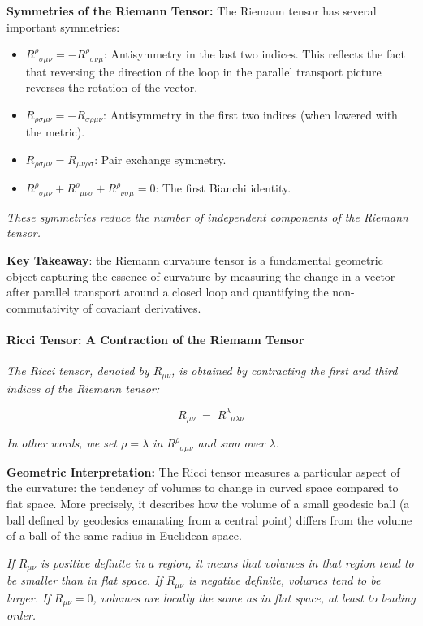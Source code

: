 \textbf{Symmetries of the Riemann Tensor:} The Riemann tensor has several important symmetries:
\begin{itemize}
    \item \(R^\rho_{\;\;\sigma\mu\nu} = -R^\rho_{\;\;\sigma\nu\mu}\): Antisymmetry in the last two indices. This reflects the fact that reversing the direction of the loop in the parallel transport picture reverses the rotation of the vector.
    \item \(R_{\rho\sigma\mu\nu} = -R_{\sigma\rho\mu\nu}\): Antisymmetry in the first two indices (when lowered with the metric).
    \item \(R_{\rho\sigma\mu\nu} = R_{\mu\nu\rho\sigma}\): Pair exchange symmetry.
    \item \(R^\rho_{\;\;\sigma\mu\nu} + R^\rho_{\;\;\mu\nu\sigma} + R^\rho_{\;\;\nu\sigma\mu} = 0\): The first Bianchi identity.
\end{itemize}

\textit{These symmetries reduce the number of independent components of the Riemann tensor.}

\textbf{Key Takeaway}: the Riemann curvature tensor is a fundamental geometric object capturing the essence of curvature by measuring the change in a vector after parallel transport around a closed loop and quantifying the non-commutativity of covariant derivatives.

\paragraph{Ricci Tensor: A Contraction of the Riemann Tensor}

\textit{The Ricci tensor, denoted by \(R_{\mu\nu}\), is obtained by contracting the first and third indices of the Riemann tensor:}

\[
R_{\mu\nu} \;=\; R^\lambda_{\;\;\mu\lambda\nu}
\]

\textit{In other words, we set \(\rho = \lambda\) in \(R^\rho_{\;\;\sigma\mu\nu}\) and sum over \(\lambda\).}

\textbf{Geometric Interpretation:} The Ricci tensor measures a particular aspect of the curvature: the tendency of volumes to change in curved space compared to flat space. More precisely, it describes how the volume of a small geodesic ball (a ball defined by geodesics emanating from a central point) differs from the volume of a ball of the same radius in Euclidean space.

\textit{If \(R_{\mu\nu}\) is positive definite in a region, it means that volumes in that region tend to be smaller than in flat space. If \(R_{\mu\nu}\) is negative definite, volumes tend to be larger. If \(R_{\mu\nu} = 0\), volumes are locally the same as in flat space, at least to leading order.}

